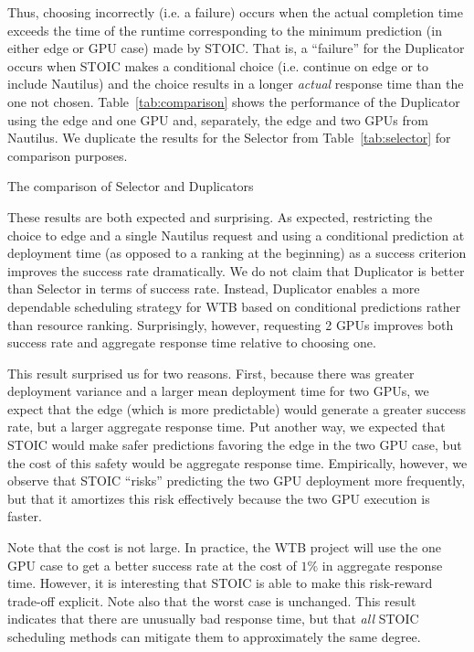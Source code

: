 Thus, choosing incorrectly (i.e. a failure) occurs when the actual completion time exceeds the time of the runtime corresponding to the minimum prediction (in either edge or GPU case) made by STOIC. That is, a ``failure'' for the Duplicator occurs when STOIC makes a conditional choice (i.e. continue on edge or to include Nautilus) and the choice results in a longer \textit{actual} response time than the one not chosen. Table~\ref{tab:comparison} shows the performance of the Duplicator using the edge and one GPU and, separately, the edge and two GPUs from Nautilus. We duplicate the results for the Selector from Table~\ref{tab:selector} for comparison purposes.

\begin{table}[t] 
\centering
\captionsetup{justification=centering}

\caption{
The comparison of Selector and Duplicators}
\label{tab:comparison}
\end{table}

These results are both expected and surprising. As expected, restricting the choice to edge and a single Nautilus request and using a conditional prediction at deployment time (as opposed to a ranking at the beginning) as a success criterion improves the success rate dramatically. We do not claim that Duplicator is better than Selector in terms of success rate. Instead, Duplicator enables a more dependable scheduling strategy for WTB based on conditional predictions rather than resource ranking. Surprisingly, however, requesting 2 GPUs improves both success rate and aggregate response time relative to choosing one.

This result surprised us for two reasons. First, because there was greater deployment variance and a larger mean deployment time for two GPUs, we expect that the edge (which is more predictable) would generate a greater success rate, but a larger aggregate response time. Put another way, we expected that STOIC would make safer predictions favoring the edge in the two GPU case, but the cost of this safety would be aggregate response time. Empirically, however, we observe that STOIC ``risks'' predicting the two GPU deployment more frequently, but that it amortizes this risk effectively because the two GPU execution is faster.

Note that the cost is not large. In practice, the WTB project will use the one GPU case to get a better success rate at the cost of $1\%$ in aggregate response time.  However, it is interesting that STOIC is able to make this risk-reward trade-off explicit. Note also that the worst case is unchanged. This result indicates that there are unusually bad response time, but that \textit{all} STOIC scheduling methods can mitigate them to approximately the same degree.

